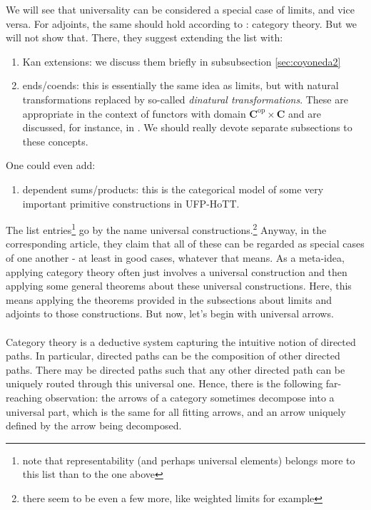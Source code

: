 We will see that universality can be considered a special case of limits, and vice versa.
For adjoints, the same should hold according to \cite{wiki-nlab0000}: category theory.
But we will not show that.
There, they suggest extending the list with:
\begin{enumerate}
\item[$\bullet$]
Kan extensions: we discuss them briefly in subsubsection \ref{sec:coyoneda2}
\item[$\bullet$]
ends/coends: this is essentially the same idea as limits, but with natural transformations replaced by so-called \textit{dinatural transformations}.
These are appropriate in the context of functors with domain $\mathbf{C}^{\mathrm{op}} \times \mathbf{C}$ and are discussed, for instance, in \cite{0b0672dc}.
We should really devote separate subsections to these concepts.
\end{enumerate}
One could even add:
\begin{enumerate}
\item[$\bullet$]
dependent sums/products: this is the categorical model of some very important primitive constructions in UFP-HoTT.
\end{enumerate}
The list entries\footnote{note that representability (and perhaps universal elements) belongs more to this list than to the one above} go by the name {\glqq}universal constructions{\grqq}.\footnote{there seem to be even a few more, like weighted limits for example}
Anyway, in the corresponding \cite{wiki-nlab0000} article, they claim that all of these can be regarded as special cases of one another - at least in {\glqq}good{\grqq} cases, whatever that means.
As a meta-idea, applying category theory often just involves a universal construction and then applying some general theorems about these universal constructions.
Here, this means applying the theorems provided in the subsections about limits and adjoints to those constructions.
But now, let's begin with universal arrows.
\\\\
Category theory is a deductive system capturing the intuitive notion of directed paths.
In particular, directed paths can be the composition of other directed paths.
There may be directed paths such that any other directed path can be uniquely routed through this {\glqq}universal{\grqq} one.
Hence, there is the following far-reaching observation: the arrows of a category sometimes decompose into a {\glqq}universal{\grqq} part, which is the same for all {\glqq}fitting{\grqq} arrows, and an arrow uniquely defined by the arrow being decomposed.
